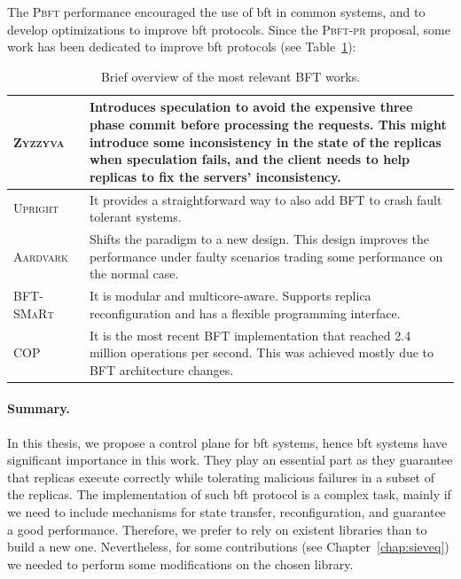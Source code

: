 The \textsc{Pbft} performance encouraged the use of \gls{bft} in common systems, and to develop optimizations to improve \gls{bft} protocols. 
Since the \textsc{Pbft-pr} proposal, some work has been dedicated to improve \gls{bft} protocols (see Table~\ref{tab:bft}):


\begin{table}[h]
\begin{center}
{\footnotesize
\begin{tabular}{ p{2.5cm}  p{10.0cm}  }\hline
\textsc{Zyzzyva}~\cite{Kotla:2010}  & Introduces speculation to avoid the expensive three phase commit before processing the requests. This might introduce some inconsistency in the state of the replicas when speculation fails, and the client needs to help replicas to fix the servers’ inconsistency. \\ \hline            
\textsc{Upright}~\cite{Clement:2009} & It provides a straightforward way to also add BFT to crash fault tolerant systems. \\ \hline    
\textsc{Aardvark}~\cite{Clement:2009b} & Shifts the paradigm to a new design. This design improves the performance under faulty scenarios trading some performance on the normal case. \\ \hline
\textsc{BFT-SMaRt}~\cite{Bessani:2014} & It is modular and multicore-aware. Supports replica reconfiguration and has a flexible programming interface. \\ \hline
\textsc{COP}~\cite{Behl:2015} & It is the most recent BFT implementation that reached 2.4 million operations per second. This was achieved mostly due to BFT architecture changes.\\  \hline  
\end{tabular}
}
\caption{Brief overview of the most relevant BFT works.}

\label{tab:bft}
\end{center}
\end{table}




\paragraph{Summary.} 

In this thesis, we propose a control plane for \gls{bft} systems, hence \gls{bft} systems have significant importance in this work.
They play an essential part as they guarantee that replicas execute correctly while tolerating malicious failures in a subset of the replicas.
The implementation of such \gls{bft} protocol is a complex task, mainly if we need to include mechanisms for state transfer, reconfiguration, and guarantee a good performance.
Therefore, we prefer to rely on existent libraries than to build a new one.
Nevertheless, for some contributions (see Chapter~\ref{chap:sieveq}) we needed to perform some modifications on the chosen library.

